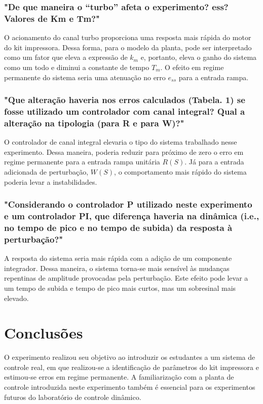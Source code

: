 \subsubsection{"De que maneira o “turbo” afeta o experimento? ess? Valores de Km e Tm?"}



O acionamento do canal turbo proporciona uma resposta mais rápida do motor do kit impressora. Dessa forma, para o modelo da planta, pode ser interpretado como um fator que eleva a expressão de $k_m$ e, portanto, eleva o ganho do sistema como um todo e diminui a constante de tempo $T_m$. O efeito em regime permanente do sistema seria uma atenuação no erro $e_{ss}$ para a entrada rampa.

\subsubsection{"Que alteração haveria nos erros calculados (Tabela. 1) se fosse utilizado um controlador com canal integral? Qual a alteração na tipologia (para R e para W)?"}

O controlador de canal integral elevaria o tipo do sistema trabalhado nesse experimento. Dessa maneira, poderia reduzir para próximo de zero o erro em regime permanente para a entrada rampa unitária $R(S)$. Já para a entrada adicionada de perturbação, $W(S)$, o comportamento mais rápido do sistema poderia levar a instabilidades.

\subsubsection{"Considerando o controlador P utilizado neste experimento e um controlador PI, que diferença haveria na dinâmica (i.e., no tempo de pico e no tempo de subida) da resposta à perturbação?"}

A resposta do sistema seria mais rápida com a adição de um componente integrador. Dessa maneira, o sistema torna-se mais sensível às mudanças repentinas de amplitude provocadas pela perturbação. Este efeito pode levar a um tempo de subida e tempo de pico mais curtos, mas um sobresinal mais elevado.


\section{Conclusões}

O experimento realizou seu objetivo ao introduzir os estudantes a um sistema de controle real, em que realizou-se a identificação de parâmetros do kit impressora e estimou-se erros em regime permanente. A familiarização com a planta de controle introduzida neste experimento também é essencial para os experimentos futuros do laboratório de controle dinâmico.